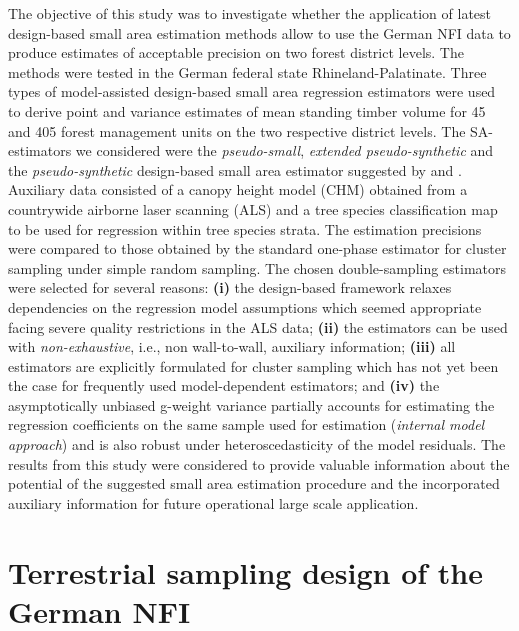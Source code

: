 The objective of this study was to investigate whether the application of latest design-based small area estimation methods allow to use the German NFI data to produce estimates of acceptable precision on two forest district levels. The methods were tested in the German federal state Rhineland-Palatinate. Three types of model-assisted design-based small area regression estimators were used to derive point and variance estimates of mean standing timber volume for 45 and 405 forest management units on the two respective district levels. The SA-estimators we considered were the \textit{pseudo-small}, \textit{extended pseudo-synthetic} and the \textit{pseudo-synthetic} design-based small area estimator suggested by \citet{mandallaz2013a} and \citet{ mandallaz2013b}. Auxiliary data consisted of a canopy height model (CHM) obtained from a countrywide airborne laser scanning (ALS) and a tree species classification map to be used for regression within tree species strata. The estimation precisions were compared to those obtained by the standard one-phase estimator for cluster sampling under simple random sampling. The chosen double-sampling estimators were selected for several reasons: \textbf{(i)} the design-based framework relaxes dependencies on the regression model assumptions which seemed appropriate facing severe quality restrictions in the ALS data; \textbf{(ii)} the estimators can be used with \textit{non-exhaustive}, i.e., non wall-to-wall, auxiliary information; \textbf{(iii)} all estimators are explicitly formulated for cluster sampling which has not yet been the case for frequently used model-dependent estimators; and \textbf{(iv)} the asymptotically unbiased g-weight variance partially accounts for estimating the regression coefficients on the same sample used for estimation (\textit{internal model approach}) and is also robust under heteroscedasticity of the model residuals. The results from this study were considered to provide valuable information about the potential of the suggested small area estimation procedure and the incorporated auxiliary information for future operational large scale application.\par


\section{Terrestrial sampling design of the German NFI}
\label{sec:germanNFI}

